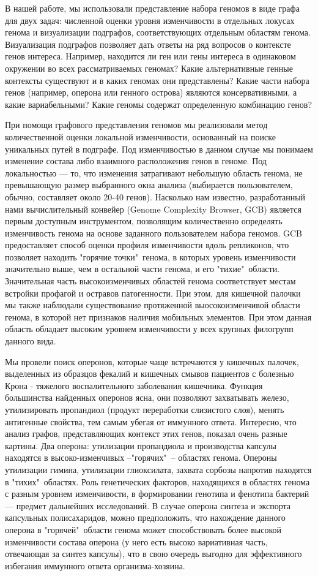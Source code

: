 В нашей работе, мы использовали представление набора геномов в виде графа для двух задач: численной оценки уровня изменчивости в отдельных локусах генома и визуализации подграфов, соответствующих отдельным областям генома. Визуализация подграфов позволяет дать ответы на ряд вопросов о контексте генов интереса. Например, находится ли ген или гены интереса в одинаковом окружении во всех рассматриваемых геномах? Какие альтернативные генные контексты существуют и в каких геномах они представлены? Какие части набора генов (например, оперона или генного острова) являются консервативными, а какие вариабельными? Какие геномы содержат определенную комбинацию генов? 

При помощи графового представления геномов мы реализовали метод количественной оценки локальной изменчивости, основанный на поиске уникальных путей в подграфе. Под изменчивостью в данном случае мы понимаем изменение состава либо взаимного расположения генов в геноме. Под локальностью --- то, что изменения затрагивают небольшую область генома, не превышающую размер выбранного окна анализа (выбирается пользователем, обычно, составляет около 20-40 генов). Насколько нам известно, разработанный нами вычислительный конвейер (Genome Complexity Browser, GCB) является первым доступным инструментом, позволящим количественно определять изменчивость генома на основе заданного пользователем набора геномов. GCB предоставляет способ оценки профиля изменчивости вдоль репликонов, что позволяет находить "горячие точки"\ генома, в которых уровень изменчивости значительно выше, чем в остальной части генома, и его "тихие"\ области. Значительная часть высокоизменчивых областей генома соответствует местам встройки профагой и остравов патогенности. При этом, для кишечной палочки мы также наблюдали существование протяженной выосокоизменчивой области генома, в которой нет признаков наличия мобильных элементов. При этом данная область обладает высоким уровнем изменчивости у всех крупных филогрупп данного вида. 

Мы провели поиск оперонов, которые чаще встречаются у кишечных палочек, выделенных из образцов фекалий и кишечных смывов пациентов с болезнью Крона - тяжелого воспалительного заболевания кишечника. Функция большинства найденных оперонов ясна, они позволяют захватывать железо, утилизировать пропандиол (продукт переработки слизистого слоя), менять антигенные свойства, тем самым убегая от иммунного ответа. Интересно, что анализ графов, представляющих контекст этих генов, показал очень разные картины. Два оперона: утилизации пропандиола и производства капсулы находятся в высоко-изменчивых --"горячих"\ -- областях генома. Опероны утилизации гимина, утилизации глиоксилата, захвата сорбозы напротив находятся в "тихих"\ областях. Роль генетических факторов, находящихся в областях генома с разным уровнем изменчивости, в формировании генотипа и фенотипа бактерий --- предмет дальнейших исследований. В случае оперона синтеза и экспорта капсульных полисахаридов, можно предположить, что нахождение данного оперона в "горячей"\ области генома может способствовать более высокой изменчивости состава оперона (у него есть высоко вариативная часть, отвечающая за синтез капсулы), что в свою очередь выгодно для эффективного избегания иммунного ответа организма-хозяина.

